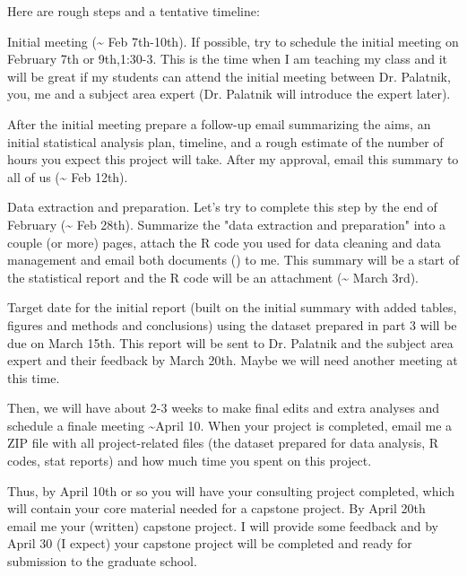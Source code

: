 \documentclass[11pt]{article}
\begin{document}
Here are rough steps and a tentative timeline:

Initial meeting (\textasciitilde{} Feb 7th-10th). If possible, try to schedule the initial meeting on February 7th or 9th,1:30-3. This is the time when I am teaching my class and it will be great if my students can attend the initial meeting between Dr. Palatnik, you, me and a subject area expert (Dr. Palatnik will introduce the expert later).    

After the initial meeting prepare a follow-up email summarizing the aims, an initial statistical analysis plan, timeline, and a rough estimate of the number of hours you expect this project will take. After my approval, email this summary to all of us (\textasciitilde{} Feb 12th). 

Data extraction and preparation. Let's try to complete this step by the end of February (\textasciitilde{} Feb 28th). Summarize the "data extraction and preparation" into a couple (or more) pages, attach the R code you used for data cleaning and data management and email both documents () to me. This summary will be a start of the statistical report and the R code will be an attachment (\textasciitilde{} March 3rd).

Target date for the initial report (built on the initial summary with added tables, figures and methods and conclusions) using the dataset prepared in part 3 will be due on March 15th. This report will be sent to Dr. Palatnik and the subject area expert and their feedback by March 20th. Maybe we will need another meeting at this time.

Then, we will have about 2-3 weeks to make final edits and extra analyses and schedule a finale meeting \textasciitilde{}April 10. When your project is completed,  email me a ZIP file with all project-related files (the dataset prepared for data analysis, R codes, stat reports) and how much time you spent on this project.

Thus, by April 10th or so you will have your consulting project completed, which will contain your core material needed for a capstone project.  By April 20th email me your (written) capstone project. I will provide some feedback and by April 30 (I expect) your capstone project will be completed and ready for submission to the graduate school.
\end{document}
